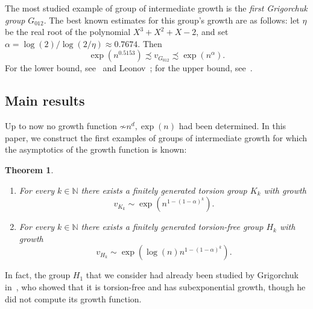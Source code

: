 \documentclass{amsart}
\newcommand\N{\mathbb{N}}
\newcommand\Grig{{G_{012}}}
\newtheorem{maintheorem}{Theorem}
\theoremstyle{definition}
\begin{document}
The most studied example of group of intermediate growth is the
\emph{first Grigorchuk group} $\Grig$. The best known estimates for
this group's growth are as follows: let $\eta$ be the real root of the
polynomial $X^3+X^2+X-2$, and set
$\alpha=\log(2)/\log(2/\eta)\approx0.7674$. Then
\begin{equation}\label{eq:grigupper}
  \exp(n^{0.5153})\precsim v_\Grig\precsim\exp(n^\alpha).
\end{equation}
For the lower bound, see~\cite{bartholdi:lowerbd} and
Leonov~\cite{leonov:lowerbd2}; for the upper bound,
see~\cite{bartholdi:upperbd}.

\subsection{Main results} Up to now no growth function $\not\sim
n^d,\exp(n)$ had been determined. In this paper, we construct the
first examples of groups of intermediate growth for which the
asymptotics of the growth function is known:
\begin{maintheorem}\label{mainthm:A}
\begin{enumerate}
\item For every $k\in\N$ there exists a finitely generated torsion
  group $K_k$ with growth
  \[v_{K_k}\sim\exp(n^{1-(1-\alpha)^k}).
  \]
\item For every $k\in\N$ there exists a finitely generated
  torsion-free group $H_k$ with growth
  \[v_{H_k}\sim\exp(\log(n)n^{1-(1-\alpha)^k}).\]
\end{enumerate}  
\end{maintheorem}
In fact, the group $H_1$ that we consider had already been studied by
Grigorchuk in~\cite{grigorchuk:gdegree}, who showed that it is
torsion-free and has subexponential growth, though he did not compute
its growth function.

\end{document}
